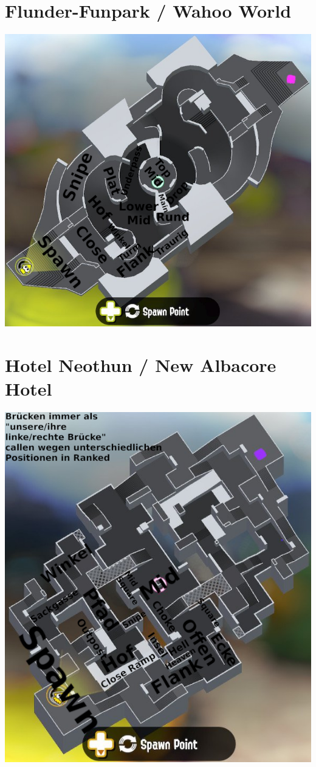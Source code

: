 \documentclass{scrreprt}
\begin{document}
\section{Flunder-Funpark / Wahoo World}
\includegraphics[width=\linewidth]{img/wahooworld.png}
\section{Hotel Neothun / New Albacore Hotel}
\includegraphics[width=\linewidth]{img/newalbacorehotel.png}
\end{document}
